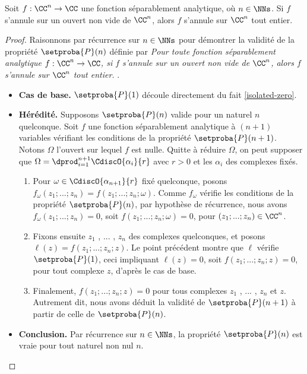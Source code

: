 \begin{fact} \label{multi-isolated-zero}
    Soit $f: \CC^n \rightarrow \CC$ une fonction séparablement analytique, où $n \in \NNs$.
	Si $f$ s'annule sur un ouvert non vide de $\CC^n$, alors $f$ s'annule sur $\CC^n$ tout entier. 
\end{fact}


\begin{proof}
	Raisonnons par récurrence sur $n \in \NNs$ pour démontrer la validité de la propriété $\setproba{P}(n)$ définie par
	\emph{\og 
		Pour toute fonction séparablement analytique $f: \CC^n \rightarrow \CC$,
		si $f$ s'annule sur un ouvert non vide de $\CC^n$,
		alors $f$ s'annule sur $\CC^n$ tout entier. 
	\fg}\kern2pt.
	\begin{itemize}[label=\small\textbullet]
		\item \textbf{Cas de base.}
		$\setproba{P}(1)$ découle directement du fait \ref{isolated-zero}.


		\item \textbf{Hérédité.}
		Supposons $\setproba{P}(n)$ valide pour un naturel $n$ quelconque.
		Soit $f$ une fonction séparablement analytique à $(n + 1)$ variables vérifiant les conditions de la propriété $\setproba{P}(n + 1)$. Notons $\Omega$ l'ouvert sur lequel $f$ est nulle.
		Quitte à réduire $\Omega$, on peut supposer que
		$\Omega = \dprod_{i=1}^{n+1} \CdiscO{\alpha_i}{r}$
		avec $r > 0$ et les $\alpha_i$ des complexes fixés.
		\begin{enumerate}
		    \item Pour $\omega \in \CdiscO{\alpha_{n+1}}{r}$ fixé quelconque,
		    posons $f_\omega(z_1 ; ... ; z_n) = f(z_1 ; ... ; z_n ; \omega)$.
		    Comme $f_\omega$ vérifie les conditions de la propriété $\setproba{P}(n)$, par hypothèse de récurrence, nous avons
		    $f_\omega(z_1 ; ... ; z_n) = 0$, 
		    soit $f(z_1 ; ... ; z_n ; \omega) = 0$,
		    pour $(z_1 ; ... ; z_n) \in \CC^n$.


		    \item Fixons ensuite $z_1$ , ... , $z_n$ des complexes quelconques, et posons $\ell(z) = f(z_1 ; ... ; z_n ; z)$.
		    Le point précédent montre que $\ell$ vérifie $\setproba{P}(1)$, ceci impliquant
		    $\ell(z) = 0$,
		    soit $f(z_1 ; ... ; z_n ; z) = 0$,
		    pour tout complexe $z$, d'après le cas de base.


		    \item Finalement, $f(z_1 ; ... ; z_n ; z) = 0$ pour tous complexes $z_1$ , ... , $z_n$ et $z$.
		    Autrement dit, nous avons déduit la validité de $\setproba{P}(n+1)$ à partir de celle de $\setproba{P}(n)$.
		\end{enumerate}
		
		
		\item \textbf{Conclusion.}
		Par récurrence sur $n \in \NNs$, la propriété $\setproba{P}(n)$ est vraie pour tout naturel non nul $n$.
	\end{itemize}

	\null\vspace{-6ex}
\end{proof}
